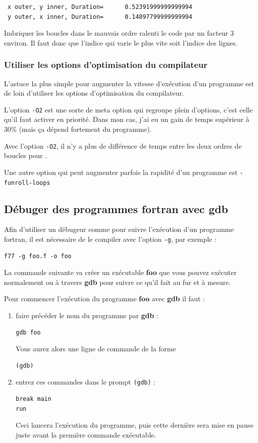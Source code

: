 \documentclass[a4paper,twoside]{article}
\begin{document}
\begin{verbatim}
 x outer, y inner, Duration=      0.52391999999999994     
 y outer, x inner, Duration=      0.14897799999999994     
\end{verbatim}

Imbriquer les boucles dans le mauvais ordre ralenti le code par un facteur 3 environ. Il faut donc que l'indice qui varie le plus vite soit l'indice des lignes. 

\subsubsection{Utiliser les options d'optimisation du compilateur}
L'astuce la plus simple pour augmenter la vitesse d'exécution d'un programme est de loin d'utiliser les options d'optimisation du compilateur. 

L'option \texttt{-O2} est une sorte de meta option qui regroupe plein d'options, c'est celle qu'il faut activer en priorité. Dans mon cas, j'ai eu un gain de temps supérieur à 30\% (mais ça dépend fortement du programme).

\begin{remarque}
Avec l'option \texttt{-O2}, il n'y a plus de différence de temps entre les deux ordres de boucles pour .
\end{remarque}

Une autre option qui peut augmenter parfois la rapidité d'un programme est \texttt{-funroll-loops}

\subsection{Débuger des programmes fortran avec gdb}
Afin d'utiliser un débugeur comme  pour suivre l'exécution d'un programme fortran, il est nécessaire de le compiler avec l'option \texttt{-g}, par exemple : 
\begin{verbatim}
f77 -g foo.f -o foo
\end{verbatim}
La commande suivante va créer un exécutable \textbf{foo} que vous pouvez exécuter normalement ou à travers \textbf{gdb} pour suivre ce qu'il fait au fur et à mesure.

\bigskip

Pour commencer l'exécution du programme \textbf{foo} avec \textbf{gdb} il faut : 
\begin{enumerate}
\item faire précéder le nom du programme par \textbf{gdb} : 
\begin{verbatim}
gdb foo
\end{verbatim}
Vous aurez alors une ligne de commande de la forme 
\begin{verbatim}
(gdb) 
\end{verbatim}
\item entrez ces commandes dans le prompt \texttt{(gdb)} :
\begin{verbatim}
break main
run
\end{verbatim}
Ceci lancera l'exécution du programme, puis cette dernière sera mise en pause juste avant la première commande exécutable.
\end{enumerate}
\end{document}
